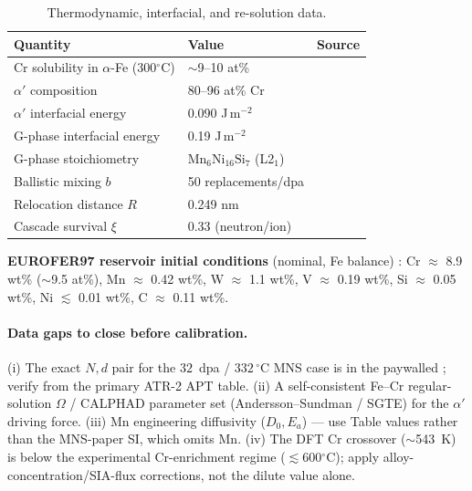 \documentclass[11pt]{article}
\begin{document}
\begin{table}[h]
\centering\small
\caption{Thermodynamic, interfacial, and re-solution data.}
\label{tab:thermo}
\begin{tabular}{lll}
\toprule
Quantity & Value & Source \\
\midrule
Cr solubility in $\alpha$-Fe (300$^\circ$C) & $\sim$9--10 at\% & \citep{Bonny2008,Mathon2003}\\
$\alpha'$ composition & 80--96 at\% Cr & \citep{Reese2018}\\
$\alpha'$ interfacial energy & 0.090 J\,m$^{-2}$ & \citep{Ke2019flux}\\
G-phase interfacial energy & 0.19 J\,m$^{-2}$ & \citep{Ke2018mns}\\
G-phase stoichiometry & $\mathrm{Mn_6Ni_{16}Si_7}$ (L2$_1$) & \citep{Ke2018mns}\\
Ballistic mixing $b$ & 50 replacements/dpa & \citep{Ke2019flux}\\
Relocation distance $R$ & 0.249 nm & \citep{Ke2019flux}\\
Cascade survival $\xi$ & 0.33 (neutron/ion) & \citep{Ke2019flux}\\
\bottomrule
\end{tabular}
\end{table}

\noindent\textbf{EUROFER97 reservoir initial conditions} (nominal, Fe balance)
\citep{Lindau2002}: Cr $\approx$ 8.9 wt\% ($\sim$9.5 at\%), Mn $\approx$ 0.42
wt\%, W $\approx$ 1.1 wt\%, V $\approx$ 0.19 wt\%, Si $\approx$ 0.05 wt\%,
Ni $\lesssim$ 0.01 wt\%, C $\approx$ 0.11 wt\%.

\paragraph{Data gaps to close before calibration.}
(i) The exact $N,d$ pair for the $32$~dpa / $332\,^\circ$C MNS case is in the
paywalled \citet{Ke2018fm}; verify from the primary ATR-2 APT table.
(ii) A self-consistent Fe--Cr regular-solution $\Omega$ / CALPHAD parameter set
(Andersson--Sundman / SGTE) for the $\alpha'$ driving force.
(iii) Mn engineering diffusivity ($D_0,E_a$) --- use \citet{Messina2020}
Table values rather than the MNS-paper SI, which omits Mn.
(iv) The DFT Cr crossover ($\sim$543~K) is below the experimental Cr-enrichment
regime ($\lesssim$600$^\circ$C); apply alloy-concentration/SIA-flux corrections,
not the dilute value alone.

\end{document}
